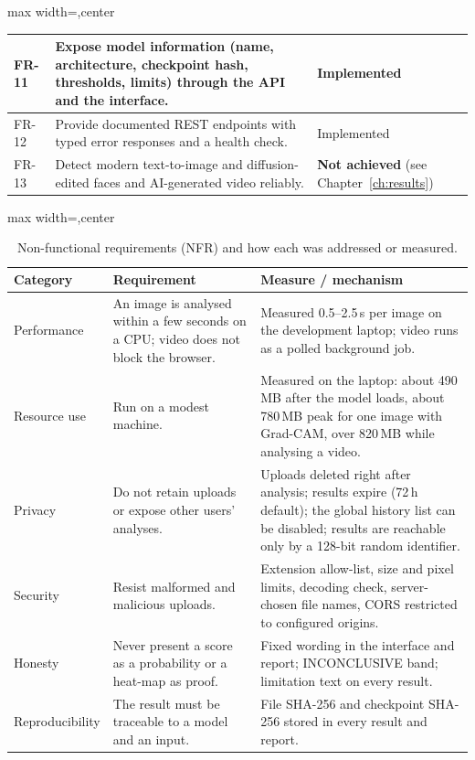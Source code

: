 \begin{table}[ht]
\begin{adjustbox}{max width=\linewidth,center}
\begin{tabular}{|p{1.0cm}|p{8.6cm}|p{2.3cm}|}
FR-11 & Expose model information (name, architecture, checkpoint hash, thresholds, limits) through the API and the interface. & Implemented \\ \hline
FR-12 & Provide documented REST endpoints with typed error responses and a health check. & Implemented \\ \hline
FR-13 & Detect modern text-to-image and diffusion-edited faces and AI-generated video reliably. & \textbf{Not achieved} (see Chapter~\ref{ch:results}) \\ \hline
\end{tabular}
\end{adjustbox}
\end{table}

\begin{table}[ht]
\centering
\caption{Non-functional requirements (NFR) and how each was addressed or measured.}
\label{tab:nfr}
\small
\begin{adjustbox}{max width=\linewidth,center}
\begin{tabular}{|p{2.4cm}|p{5.0cm}|p{4.6cm}|}
\hline
\textbf{Category} & \textbf{Requirement} & \textbf{Measure / mechanism} \\ \hline
Performance & An image is analysed within a few seconds on a CPU; video does not block the browser. & Measured 0.5--2.5\,s per image on the development laptop; video runs as a polled background job. \\ \hline
Resource use & Run on a modest machine. & Measured on the laptop: about 490\,MB after the model loads, about 780\,MB peak for one image with Grad-CAM, over 820\,MB while analysing a video. \\ \hline
Privacy & Do not retain uploads or expose other users' analyses. & Uploads deleted right after analysis; results expire (72\,h default); the global history list can be disabled; results are reachable only by a 128-bit random identifier. \\ \hline
Security & Resist malformed and malicious uploads. & Extension allow-list, size and pixel limits, decoding check, server-chosen file names, CORS restricted to configured origins. \\ \hline
Honesty & Never present a score as a probability or a heat-map as proof. & Fixed wording in the interface and report; INCONCLUSIVE band; limitation text on every result. \\ \hline
Reproducibility & The result must be traceable to a model and an input. & File SHA-256 and checkpoint SHA-256 stored in every result and report. \\ \hline

\end{tabular}
\end{adjustbox}
\end{table}
